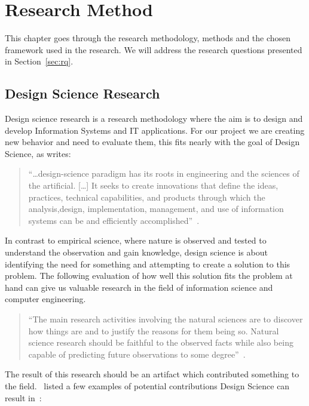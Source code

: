 \documentclass[../Main/thesis.tex]{subfiles}
\begin{document}
\chapter{Research Method}\label{ch:methodology}
This chapter goes through the research methodology, methods and the chosen
framework used in the research. We will address the research questions presented
in Section~\ref{sec:rq}.

\section{Design Science Research}%
\label{sec:design_science_research}
Design science research is a research methodology where the aim is to design and
develop Information Systems and IT applications. For our project we are creating
new behavior and need to evaluate them, this fits nearly with the goal of
Design Science, as \citeauthor{Hevner:2004:DSI:2017212.2017217} writes:

\begin{quotation}
``\ldots design-science paradigm has its roots in engineering and the sciences
of the artificial. [\ldots] It seeks to create innovations that define the
ideas, practices, technical capabilities, and products through which the
analysis,design, implementation, management, and use of information systems can
be and efficiently accomplished''~\cite{Hevner:2004:DSI:2017212.2017217}.
\end{quotation}

In contrast to empirical science, where nature is observed and tested to
understand the observation and gain knowledge, design science is about
identifying the need for something and attempting to create a solution to this
problem. The following evaluation of how well this solution fits the problem at
hand can give us valuable research in the field of information science and
computer engineering.

\begin{quotation}
``The main research activities involving the natural sciences are to discover how
things are and to justify the reasons for them being so. Natural science
research should be faithful to the observed facts while also being capable of
predicting future observations to some degree''~\cite{Dresch:2014:DSR:2671159}.
\end{quotation}

The result of this research should be an artifact which contributed something to
the field.~\citeauthor{Vaishnavi:2015:DSR:2807332} listed a few examples of
potential contributions Design Science can result in~\cite{Vaishnavi:2015:DSR:2807332}:
\end{document}
